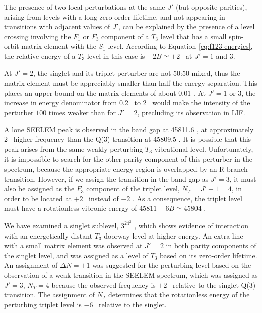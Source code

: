 The presence of two local perturbations at the same $J'$ (but opposite
parities), arising from levels with a long zero-order lifetime, and
not appearing in transitions with adjacent values of $J'$, can be
explained by the presence of a level crossing involving the $F_1$ or
$F_3$ component of a $T_3$ level that has a small spin-orbit matrix
element with the $S_1$ level.  According to Equation
\ref{eq:f123-energies}, the relative energy of a $T_3$ level in this
case is $\pm 2B \simeq \pm 2$ \rcm\ at $J'=1$ and $3$.  

At $J'=2$, the singlet and its triplet perturber are not 50:50 mixed,
thus the matrix element must be appreciably smaller than half the
energy separation.  This places an upper bound on the matrix elements
of about $0.01$ \rcm.  At $J'=1$ or $3$, the increase in energy
denominator from 0.2 \rcm\ to 2 \rcm\ would make the intensity of the
perturber $100$ times weaker than for $J'=2$, precluding its
observation in LIF.

A lone SEELEM peak is observed in the band gap at 45811.6 \rcm, at
approximately 2 \rcm\ higher frequency than the Q(3) transition at
45809.5 \rcm.  It is possible that this peak arises from the same
weakly perturbing $T_3$ vibrational level.  Unfortunately, it is
impossible to search for the other parity component of this perturber
in the spectrum, because the appropriate energy region is overlapped
by an R-branch transition.  However, if we assign the transition in
the band gap as $J'=3$, it must also be assigned as the $F_3$
component of the triplet level, $N_T=J'+1=4$, in order to be located
at $+2$ \rcm\ instead of $-2$ \rcm.  As a consequence, the triplet
level must have a rotationless vibronic energy of $45811 - 6B \simeq
45804$ \rcm.

We have examined a singlet sublevel, $3^24^2$ , which shows
evidence of interaction with an energetically distant $T_3$ doorway
level at higher energy.  An extra line with a small matrix element was
observed at $J'=2$ in both parity components of the singlet level, and
was assigned as a level of $T_3$ based on its zero-order lifetime.  An
assignment of $\Delta N=+1$ was suggested for the perturbing level
based on the observation of a weak transition in the SEELEM spectrum,
which was assigned as $J'=3$, $N_T=4$ because the observed frequency
is $+2$ \rcm\ relative to the singlet Q(3) transition.  The assignment
of $N_T$ determines that the rotationless energy of the perturbing
triplet level is $-6$ \rcm\ relative to the singlet.

